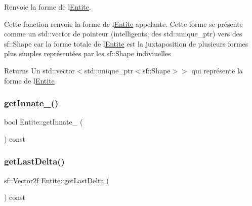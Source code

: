 Renvoie la forme de l\textquotesingle{}\mbox{\hyperlink{class_entite}{Entite}}. 

Cette fonction renvoie la forme de l\textquotesingle{}\mbox{\hyperlink{class_entite}{Entite}} appelante. Cette forme se présente comme un {\ttfamily std\+::vector} de pointeur (intelligents, des {\ttfamily std\+::unique\+\_\+ptr}) vers des {\ttfamily sf\+::\+Shape} car la forme totale de l\textquotesingle{}\mbox{\hyperlink{class_entite}{Entite}} est la juxtaposition de plusieurs formes plus simples représentées par les {\ttfamily sf\+::\+Shape} indiviuelles \begin{DoxyReturn}{Returns}
Un {\ttfamily std\+::vector$<$std\+::unique\+\_\+ptr$<$sf\+::\+Shape$>$$>$} qui représente la forme de l\textquotesingle{}\mbox{\hyperlink{class_entite}{Entite}} 
\end{DoxyReturn}
\mbox{\label{class_entite_af607aa77e0ce2f6afa3cf8fdd073b9cf}} 
\subsubsection{\texorpdfstring{get\+Innate\+\_\+()}{getInnate\_()}}
{\footnotesize\ttfamily bool Entite\+::get\+Innate\+\_\+ (\begin{DoxyParamCaption}{ }\end{DoxyParamCaption}) const\hspace{0.3cm}{\ttfamily [inline]}}

\mbox{\label{class_entite_aa4c414fcfe783fc8483ce9466d8764c0}} 
\subsubsection{\texorpdfstring{get\+Last\+Delta()}{getLastDelta()}}
{\footnotesize\ttfamily sf\+::\+Vector2f Entite\+::get\+Last\+Delta (\begin{DoxyParamCaption}{ }\end{DoxyParamCaption}) const\hspace{0.3cm}{\ttfamily [inline]}}

\mbox{\label{class_entite_a23480947ca71fd3c6004f8b704f675b0}} 
